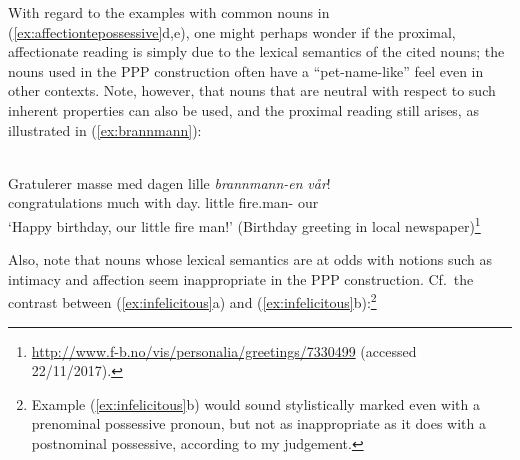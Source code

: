 \documentclass[output=paper]{langsci/langscibook}
\begin{document}
\ea\label{ex:speech} 

	 		\z
\z

\noindent With regard to the examples with common nouns  in
(\ref{ex:affectiontepossessive}d,e), one might perhaps wonder if the proximal,
affectionate reading is simply due to the lexical semantics of the cited nouns;
the nouns used in the PPP construction often have a ``pet-name-like''  feel
even in other contexts. Note, however, that nouns that are neutral with
respect to such inherent properties can also be used, and the  proximal reading
still arises, as illustrated in (\ref{ex:brannmann}):

\ea\label{ex:brannmann} \\
	\gll  Gratulerer masse med dagen  lille \textit{brannmann-en} \textit{vår}!\\
	congratulations much with day.\Def{} little fire.man-\Def{} our\\
    \glt `Happy birthday, our little fire man!' (Birthday greeting in local
    newspaper)\footnote{\url{http://www.f-b.no/vis/personalia/greetings/7330499}
    (accessed 22/11/2017).}
\z

\noindent Also, note that nouns whose lexical semantics are at odds with
notions such as intimacy and affection seem inappropriate in the PPP
construction. Cf.\ the contrast between (\ref{ex:infelicitous}a) and
(\ref{ex:infelicitous}b):\footnote{Example (\ref{ex:infelicitous}b)
    would sound stylistically marked even with a prenominal possessive pronoun,
    but not as inappropriate as it does with a postnominal possessive,
according to my judgement.}

\ea\label{ex:infelicitous} 
\end{document}
